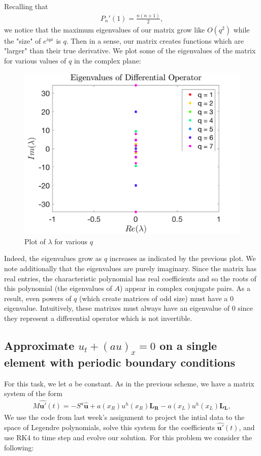 \documentclass{article}
\begin{document}
\noindent Recalling that 
	\begin{align*}
		P_n'(1) = \frac{n(n+1)}{2}, 
	\end{align*}
we notice that the maximum eigenvalues of our matrix grow like $O(q^2)$ while the "size" of $e^{iqx}$ is $q$. Then in a sense, our matrix creates functions which are "larger" than their true derivative. We plot some of the eigenvalues of the matrix for various values of $q$ in the complex plane:

\begin{figure}[H]
  \centering
  \includegraphics[scale=0.7]{plots/eig_plot.png}
  \caption{Plot of $\lambda$ for various $q$}
  \label{fig:eig_values}
\end{figure}
\noindent Indeed, the eigenvalues grow as $q$ increases as indicated by the previous plot. We note additionally that the eigenvalues are purely imaginary. Since the matrix has real entries, the characteristic polynomial has real coefficients and so the roots of this polynomial (the eigenvalues of $A$) appear in complex conjugate pairs. As a result, even powers of $q$ (which create matrices of odd size) must have a $0$ eigenvalue. Intuitively, these matrixes must always have an eigenvalue of $0$ since they represent a differential operator which is not invertible.

\subsection{Approximate $u_t + \left( a u\right)_x = 0$ on a single element with periodic boundary conditions}
For this task, we let $a$ be constant. As in the previous scheme, we have a matrix system of the form
	\begin{align*}
		M \boldsymbol{\hat{u'}}(t) = -S^a \boldsymbol{\hat{u}} + a(x_R)u^h(x_R)\boldsymbol{L_R} - a(x_L)u^h(x_L)\boldsymbol{L_L},
	\end{align*}
We use the code from last week's assignment to project the intial data to the space of Legendre polynomials, solve this system for the coefficients $\boldsymbol{\hat{u'}}(t)$, and use RK4 to time step and evolve our solution. For this problem we consider the following:
\end{document}
